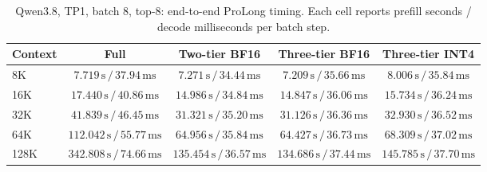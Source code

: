 \begin{table}[t]
\centering
\small
\caption{Qwen3.8, TP1, batch 8, top-8: end-to-end ProLong timing. Each cell reports prefill seconds / decode milliseconds per batch step.}
\label{tab:prolong-qwen38-tp1-b8-end-to-end}
\begin{tabular}{lcccc}
\toprule
Context & Full & Two-tier BF16 & Three-tier BF16 & Three-tier INT4 \\
\midrule
8K & \(7.719\,\mathrm{s}\,/\,37.94\,\mathrm{ms}\) & \(7.271\,\mathrm{s}\,/\,34.44\,\mathrm{ms}\) & \(7.209\,\mathrm{s}\,/\,35.66\,\mathrm{ms}\) & \(8.006\,\mathrm{s}\,/\,35.84\,\mathrm{ms}\) \\
16K & \(17.440\,\mathrm{s}\,/\,40.86\,\mathrm{ms}\) & \(14.986\,\mathrm{s}\,/\,34.84\,\mathrm{ms}\) & \(14.847\,\mathrm{s}\,/\,36.06\,\mathrm{ms}\) & \(15.734\,\mathrm{s}\,/\,36.24\,\mathrm{ms}\) \\
32K & \(41.839\,\mathrm{s}\,/\,46.45\,\mathrm{ms}\) & \(31.321\,\mathrm{s}\,/\,35.20\,\mathrm{ms}\) & \(31.126\,\mathrm{s}\,/\,36.36\,\mathrm{ms}\) & \(32.930\,\mathrm{s}\,/\,36.52\,\mathrm{ms}\) \\
64K & \(112.042\,\mathrm{s}\,/\,55.77\,\mathrm{ms}\) & \(64.956\,\mathrm{s}\,/\,35.84\,\mathrm{ms}\) & \(64.427\,\mathrm{s}\,/\,36.73\,\mathrm{ms}\) & \(68.309\,\mathrm{s}\,/\,37.02\,\mathrm{ms}\) \\
128K & \(342.808\,\mathrm{s}\,/\,74.66\,\mathrm{ms}\) & \(135.454\,\mathrm{s}\,/\,36.57\,\mathrm{ms}\) & \(134.686\,\mathrm{s}\,/\,37.44\,\mathrm{ms}\) & \(145.785\,\mathrm{s}\,/\,37.70\,\mathrm{ms}\) \\
\bottomrule
\end{tabular}
\end{table}

